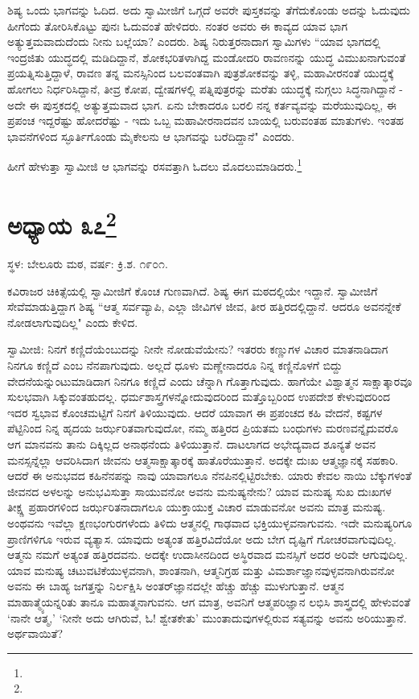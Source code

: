 ಶಿಷ್ಯ ಒಂದು ಭಾಗವನ್ನು ಓದಿದ. ಅದು ಸ್ವಾಮೀಜಿಗೆ ಒಗ್ಗದೆ ಅವರೇ ಪುಸ್ತಕವನ್ನು ತೆಗೆದುಕೊಂಡು ಅದನ್ನು ಓದುವುದು ಹೀಗೆಂದು ತೋರಿಸಿಕೊಟ್ಟು ಪುನಃ ಓದುವಂತೆ ಹೇಳಿದರು. ನಂತರ ಅವರು ಈ ಕಾವ್ಯದ ಯಾವ ಭಾಗ ಅತ್ಯುತ್ತಮವಾದುದೆಂದು ನೀನು ಬಲ್ಲೆಯಾ? ಎಂದರು. ಶಿಷ್ಯ ನಿರುತ್ತರನಾದಾಗ ಸ್ವಾಮಿಗಳು “ಯಾವ ಭಾಗದಲ್ಲಿ ಇಂದ್ರಜಿತು ಯುದ್ಧದಲ್ಲಿ ಮಡಿದಿದ್ದಾನೆ, ಶೋಕಭರಿತಳಾಗಿದ್ದ ಮಂಡೋದರಿ ರಾವಣನನ್ನು ಯುದ್ಧ ವಿಮುಖನಾಗುವಂತೆ ಪ್ರಯತ್ನಿಸುತ್ತಿದ್ದಾಳೆ, ರಾವಣ ತನ್ನ ಮನಸ್ಸಿನಿಂದ ಬಲವಂತವಾಗಿ ಪುತ್ರಶೋಕವನ್ನು ತಳ್ಳಿ, ಮಹಾವೀರನಂತೆ ಯುದ್ಧಕ್ಕೆ ಹೋಗಲು ನಿರ್ಧರಿಸಿದ್ದಾನೆ, ತೀವ್ರ ಕೋಪ, ದ್ವೇಷಗಳಲ್ಲಿ ಪತ್ನಿಪುತ್ರರನ್ನು ಮರೆತು ಯುದ್ಧಕ್ಕೆ ನುಗ್ಗಲು ಸಿದ್ಧನಾಗಿದ್ದಾನೆ - ಅದೇ ಈ ಪುಸ್ತಕದಲ್ಲಿ ಅತ್ಯುತ್ತಮವಾದ ಭಾಗ. ಏನು ಬೇಕಾದರೂ ಬರಲಿ ನನ್ನ ಕರ್ತವ್ಯವನ್ನು ಮರೆಯುವುದಿಲ್ಲ, ಈ ಪ್ರಪಂಚ ಇದ್ದರೆಷ್ಟು ಹೋದರೆಷ್ಟು - ಇದು ಒಬ್ಬ ಮಹಾವೀರನಾದವನ ಬಾಯಲ್ಲಿ ಬರುವಂತಹ ಮಾತುಗಳು. ಇಂತಹ ಭಾವನೆಗಳಿಂದ ಸ್ಫೂರ್ತಿಗೊಂಡು ಮೈಕೇಲನು ಆ ಭಾಗವನ್ನು ಬರೆದಿದ್ದಾನೆ" ಎಂದರು.

ಹೀಗೆ ಹೇಳುತ್ತಾ ಸ್ವಾಮೀಜಿ ಆ ಭಾಗವನ್ನು ರಸವತ್ತಾಗಿ ಓದಲು ಮೊದಲುಮಾಡಿದರು.\footnote{}

\newpage

\chapter[ಅಧ್ಯಾಯ ೩೭]{ಅಧ್ಯಾಯ ೩೭\protect\footnote{}}

\begin{center}
ಸ್ಥಳ: ಬೇಲೂರು ಮಠ, ವರ್ಷ: ಕ್ರಿ.ಶ. ೧೯೦೧.
\end{center}

ಕವಿರಾಜರ ಚಿಕಿತ್ಸೆಯಲ್ಲಿ ಸ್ವಾಮೀಜಿಗೆ ಕೊಂಚ ಗುಣವಾಗಿದೆ. ಶಿಷ್ಯ ಈಗ ಮಠದಲ್ಲಿಯೇ ಇದ್ದಾನೆ. ಸ್ವಾಮೀಜಿಗೆ ಸೇವೆಮಾಡುತ್ತಿದ್ದಾಗ ಶಿಷ್ಯ “ಆತ್ಮ ಸರ್ವವ್ಯಾಪಿ, ಎಲ್ಲಾ ಜೀವಿಗಳ ಜೀವ, ತೀರ ಹತ್ತಿರದಲ್ಲಿದ್ದಾನೆ. ಆದರೂ ಅವನನ್ನೇಕೆ ನೋಡಲಾಗುವುದಿಲ್ಲ" ಎಂದು ಕೇಳಿದ.

ಸ್ವಾಮೀಜಿ: ನಿನಗೆ ಕಣ್ಣಿದೆಯೆಂಬುದನ್ನು ನೀನೇ ನೋಡುವೆಯೇನು? ಇತರರು ಕಣ್ಣುಗಳ ವಿಚಾರ ಮಾತನಾಡಿದಾಗ ನಿನಗೂ ಕಣ್ಣಿದೆ ಎಂಬ ನೆನಪಾಗುವುದು. ಅಲ್ಲದೆ ಧೂಳು ಮಣ್ಣೇನಾದರೂ ನಿನ್ನ ಕಣ್ಣಿನೊಳಗೆ ಬಿದ್ದು ವೇದನೆಯನ್ನುಂಟುಮಾಡಿದಾಗ ನಿನಗೂ ಕಣ್ಣಿದೆ ಎಂದು ಚೆನ್ನಾಗಿ ಗೊತ್ತಾಗುವುದು. ಹಾಗೆಯೇ ವಿಶ್ವಾತ್ಮನ ಸಾಕ್ಷಾತ್ಕಾರವೂ ಸುಲಭವಾಗಿ ಸಿಕ್ಕುವಂತಹುದಲ್ಲ. ಧರ್ಮಶಾಸ್ತ್ರಗಳನ್ನೋದುವುದರಿಂದ ಮತ್ತೊಬ್ಬರಿಂದ ಉಪದೇಶ ಕೇಳುವುದರಿಂದ ಇದರ ಸ್ವಭಾವ ಕೊಂಚಮಟ್ಟಿಗೆ ನಿನಗೆ ತಿಳಿಯುವುದು. ಆದರೆ ಯಾವಾಗ ಈ ಪ್ರಪಂಚದ ಕಹಿ ವೇದನೆ, ಕಷ್ಟಗಳ ಪೆಟ್ಟಿನಿಂದ ನಿನ್ನ ಹೃದಯ ಜರ್ಝರಿತವಾಗುವುದೋ, ನಮ್ಮ ಹತ್ತಿರದ ಪ್ರಿಯತಮ ಬಂಧುಗಳು ಮರಣವನ್ನೈದುವರೊ ಆಗ ಮಾನವನು ತಾನು ದಿಕ್ಕಿಲ್ಲದ ಅನಾಥನೆಂದು ತಿಳಿಯುತ್ತಾನೆ. ದಾಟಲಾಗದ ಅಭೇದ್ಯವಾದ ಶೂನ್ಯತೆ ಅವನ ಮನಸ್ಸನ್ನೆಲ್ಲಾ ಆವರಿಸಿದಾಗ ಜೀವನು ಆತ್ಮಸಾಕ್ಷಾತ್ಕಾರಕ್ಕೆ ಹಾತೊರೆಯುತ್ತಾನೆ. ಅದಕ್ಕೇ ದುಃಖ ಆತ್ಮಜ್ಞಾನಕ್ಕೆ ಸಹಕಾರಿ. ಆದರೆ ಈ ಅನುಭವದ ಕಹಿನೆನಪನ್ನು ನಾವು ಯಾವಾಗಲೂ ನೆನಪಿನಲ್ಲಿಟ್ಟಿರಬೇಕು. ಯಾರು ಕೇವಲ ನಾಯಿ ಬೆಕ್ಕುಗಳಂತೆ ಜೀವನದ ಅಳಲನ್ನು ಅನುಭವಿಸುತ್ತಾ ಸಾಯುವನೋ ಅವನು ಮನುಷ್ಯನೇನು? ಯಾವ ಮನುಷ್ಯ ಸುಖ ದುಃಖಗಳ ತೀಕ್ಷ್ಣ ಪ್ರಹಾರಗಳಿಂದ ಜರ್ಝರಿತನಾದಾಗಲೂ ಯುಕ್ತಾಯುಕ್ತ ವಿಚಾರ ಮಾಡುವನೋ ಅವನು ಮಾತ್ರ ಮನುಷ್ಯ. ಅಂಥವನು ಇವೆಲ್ಲಾ ಕ್ಷಣಭಂಗುರಗಳೆಂದು ತಿಳಿದು ಆತ್ಮನಲ್ಲಿ ಗಾಢವಾದ ಭಕ್ತಿಯುಳ್ಳವನಾಗುವನು. ಇದೇ ಮನುಷ್ಯರಿಗೂ ಪ್ರಾಣಿಗಳಿಗೂ ಇರುವ ವ್ಯತ್ಯಾಸ. ಯಾವುದು ಅತ್ಯಂತ ಹತ್ತಿರವಿದೆಯೋ ಅದು ಬೇಗ ದೃಷ್ಟಿಗೆ ಗೋಚರವಾಗುವುದಿಲ್ಲ. ಆತ್ಮನು ನಮಗೆ ಅತ್ಯಂತ ಹತ್ತಿರದವನು. ಅದಕ್ಕೇ ಉದಾಸೀನದಿಂದ ಅಸ್ಥಿರವಾದ ಮನಸ್ಸಿಗೆ ಅದರ ಅರಿವೇ ಆಗುವುದಿಲ್ಲ. ಯಾವ ಮನುಷ್ಯ ಚಟುವಟಿಕೆಯುಳ್ಳವನಾಗಿ, ಶಾಂತನಾಗಿ, ಆತ್ಮನಿಗ್ರಹ ಮತ್ತು ವಿಮರ್ಶಾಜ್ಞಾನವುಳ್ಳವನಾಗಿರುವನೋ ಅವನು ಈ ಬಾಹ್ಯ ಜಗತ್ತನ್ನು ನಿರ್ಲಕ್ಷಿಸಿ ಅಂತರ್‌ಜ್ಞಾನದಲ್ಲೇ ಹೆಚ್ಚು ಹೆಚ್ಚು ಮುಳುಗುತ್ತಾನೆ. ಆತ್ಮನ ಮಾಹಾತ್ಮ್ಯೆಯನ್ನರಿತು ತಾನೂ ಮಹಾತ್ಮನಾಗುವನು. ಆಗ ಮಾತ್ರ, ಅವನಿಗೆ ಆತ್ಮಪರಿಜ್ಞಾನ ಲಭಿಸಿ ಶಾಸ್ತ್ರದಲ್ಲಿ ಹೇಳುವಂತೆ ‘ನಾನೇ ಆತ್ಮ,’ ‘ನೀನೇ ಅದು ಆಗಿರುವೆ, ಓ! ಶ್ವೇತಕೇತು’ ಮುಂತಾದುವುಗಳಲ್ಲಿರುವ ಸತ್ಯವನ್ನು ಅವನು ಅರಿಯುತ್ತಾನೆ. ಅರ್ಥವಾಯಿತೆ?

